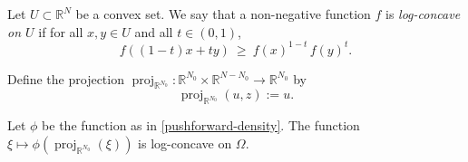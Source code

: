 \documentclass[12pt]{amsart}
\begin{document}

\begin{definition}
Let $U\subset\mathbb{R}^N$ be a convex set.
We say that a non-negative function $f$ is \emph{log-concave on $U$} if for all $x,y\in U$ and all $t\in(0,1)$,
\[
f((1-t)x+ty)\ \ge\ f(x)^{1-t}\,f(y)^t.
\]
\end{definition}
\begin{nota}
Define the projection $\operatorname{proj}_{\mathbb R^{N_0}}:\mathbb R^{N_0}\times\mathbb R^{N-N_0}\to\mathbb R^{N_0}$ by
\[
\operatorname{proj}_{\mathbb R^{N_0}}(u,z):=u .
\]
\end{nota}
\begin{lemma}\label{lem:logconcave-N}
Let $\phi$ be the function as in \eqref{pushforward-density}.
The function $\xi\mapsto \phi(\operatorname{proj}_{\mathbb R^{N_0}}(\xi))$ is log-concave on $\Omega$.
\end{lemma}
\end{document}
